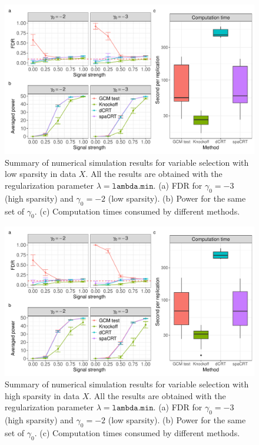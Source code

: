 \documentclass[12pt]{article}
\theoremstyle{definition}
\begin{document}
\begin{figure}[!ht]
  \centering
  \includegraphics[width=1.0\textwidth]{figures-and-tables/simulation/HMM-variable-selection/HMM_simulation_uniform_lambda.min.pdf}
  \caption{Summary of numerical simulation results for variable selection  with low sparsity in data $X$. All the results are obtained with the regularization parameter $\lambda=\texttt{lambda.min}$. (a) FDR for $\gamma_0=-3$ (high sparsity) and $\gamma_0=-2$ (low sparsity). (b) Power for the same set of $\gamma_0$. (c) Computation times consumed by different methods. }
  \label{fig:simulation-summary-GWAS-uniform-lambda-min}
\end{figure}


\begin{figure}[!ht]
  \centering
  \includegraphics[width=1.0\textwidth]{figures-and-tables/simulation/HMM-variable-selection/HMM_simulation_skew_lambda.min.pdf}
  \caption{Summary of numerical simulation results for variable selection with high sparsity in data $X$. All the results are obtained with the regularization parameter $\lambda=\texttt{lambda.min}$. (a) FDR for $\gamma_0=-3$ (high sparsity) and $\gamma_0=-2$ (low sparsity). (b) Power for the same set of $\gamma_0$. (c) Computation times consumed by different methods. }
  \label{fig:simulation-summary-GWAS-skew-lambda-min}
\end{figure}
\end{document}
